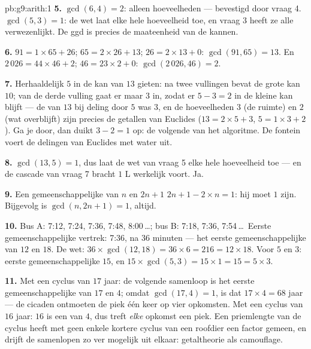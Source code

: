 \begin{solution}{pb:g9:arith:1}
\textbf{5.} $\gcd(6, 4) = 2$: alleen  hoeveelheden --- bevestigd door vraag
4. $\gcd(5, 3) = 1$: de wet laat elke hele hoeveelheid toe, en vraag 3 heeft ze
alle verwezenlijkt. De ggd is precies de maateenheid van de kannen.

\textbf{6.} $91 = 1 \times 65 + 26$; $65 = 2 \times 26 + 13$;
$26 = 2 \times 13 + 0$: $\gcd(91, 65) = 13$. En $2\,026 = 44 \times 46 + 2$;
$46 = 23 \times 2 + 0$: $\gcd(2\,026, 46) = 2$.

\textbf{7.} Herhaaldelijk $5$ in de kan van $13$ gieten: na twee vullingen bevat
de grote kan $10$; van de derde vulling gaat er maar $3$ in, zodat er
$5 - 3 = 2$ in de kleine kan blijft --- de  van $13$ bij deling door $5$ was
$3$, en de hoeveelheden $3$ (de ruimte) en $2$ (wat overblijft) zijn precies de
getallen van Euclides ($13 = 2 \times 5 + 3$, $5 = 1 \times 3 + 2$). Ga je door,
dan duikt $3 - 2 = 1$ op: de volgende  van het algoritme. De fontein voert de
delingen van Euclides met water uit.

\textbf{8.} $\gcd(13, 5) = 1$, dus laat de wet van vraag 5 elke hele hoeveelheid
toe --- en de cascade van vraag 7 bracht $1$ L werkelijk voort. Ja.

\textbf{9.} Een gemeenschappelijke  van $n$ en $2n + 1$ 
$2n + 1 - 2 \times n = 1$: hij moet $1$ zijn. Bijgevolg is $\gcd(n, 2n+1) = 1$,
altijd.

\textbf{10.} Bus A: 7:12, 7:24, 7:36, 7:48, 8:00\,\dots; bus B: 7:18, 7:36,
7:54\,\dots\ Eerste gemeenschappelijke vertrek: 7:36, na $36$ minuten --- het
eerste gemeenschappelijke  van $12$ en $18$. De wet:
$36 \times \gcd(12, 18) = 36 \times 6 = 216 = 12 \times 18$. Voor $5$ en $3$:
eerste gemeenschappelijke  $15$, en
$15 \times \gcd(5,3) = 15 \times 1 = 15 = 5 \times 3$.

\textbf{11.} Met een cyclus van $17$ jaar: de volgende samenloop is het eerste
gemeenschappelijke  van $17$ en $4$; omdat $\gcd(17, 4) = 1$, is dat
$17 \times 4 = 68$ jaar --- de cicaden ontmoeten de piek één keer op vier
opkomsten. Met een cyclus van $16$ jaar: $16$ is een  van $4$, dus treft
\emph{elke} opkomst een piek. Een priemlengte van de cyclus heeft met geen enkele
kortere cyclus van een roofdier een factor gemeen, en drijft de samenlopen zo ver
mogelijk uit elkaar: getaltheorie als camouflage.


\end{solution}
